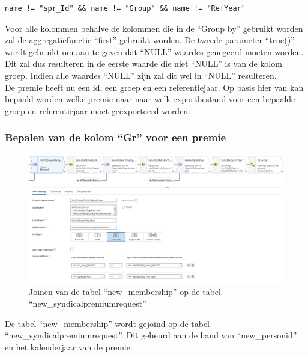 \begin{lstlisting}[language={}, caption={Expressie van group by op ``new\_syndicalpremiumrequest''.}, style=myStyle]
name != "spr_Id" && name != "Group" && name != "RefYear"
\end{lstlisting}

Voor alle kolommen behalve de kolommen die in de ``Group by'' gebruikt worden zal de aggregatiefunctie ``first'' gebruikt worden. De tweede parameter ``true()'' wordt gebruikt om aan te geven dat ``NULL'' waardes genegeerd moeten worden. Dit zal dus resulteren in de eerste waarde die niet ``NULL'' is van de kolom groep. Indien alle waardes ``NULL'' zijn zal dit wel in ``NULL'' resulteren. \\

De premie heeft nu een id, een groep en een referentiejaar. Op basis hier van kan bepaald worden welke premie naar naar welk exportbestand voor een bepaalde groep en referentiejaar moet geëxporteerd worden.



\subsubsection{Bepalen van de kolom ``Gr'' voor een premie}

\begin{figure}[H]
    \centering
    \includegraphics[width=1\textwidth]{./graphics/adf/gr_1.png}
    \caption{Joinen van de tabel ``new\_membership'' op de tabel ``new\_syndicalpremiumrequest''}
\end{figure}

De tabel ``new\_membership'' wordt gejoind op de tabel ``new\_syndicalpremiumrequest''. Dit gebeurd aan de hand van ``new\_personid'' en het kalenderjaar van de premie.


